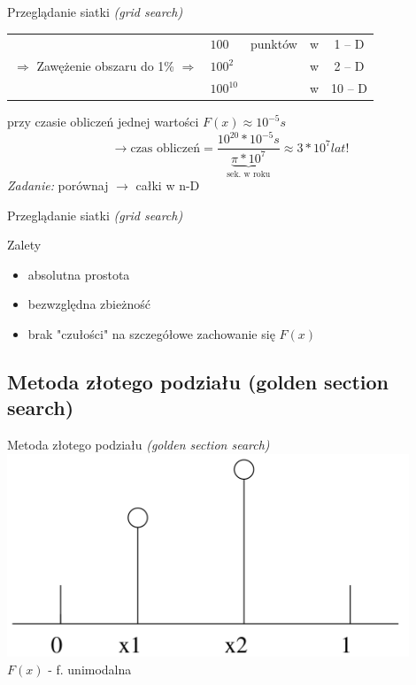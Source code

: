   \begin{frame}{Przeglądanie siatki \emph{(grid search)}}
    \begin{tabular}{@{} c l c c c @{}}
      & $ 100 $ & punktów & w & 1 -- D \\
      $ \Rightarrow $ Zawężenie obszaru do 1\% $ \Rightarrow $ & $ 100^{2} $ & & w & 2 -- D \\
      & $ 100^{10} $ & & w & 10 -- D \\
    \end{tabular}
    przy czasie obliczeń jednej wartości $F(x) \approx 10^{-5}s$
    \begin{displaymath}
      \to \text{czas obliczeń} = \frac{10^{20}*10^{-5}s}{\underbrace{\pi * 10^{7}}_{\text{sek. w roku}}} \approx 3 * 10^{7}lat \text{!}
    \end{displaymath}
    \hfill \emph{Zadanie:} porównaj $\to$ całki w n-D
  \end{frame}

  \begin{frame}{Przeglądanie siatki \emph{(grid search)}}
    \begin{block}{Zalety}
      \begin{itemize}
        \item absolutna prostota
        \item bezwzględna zbieżność
        \item brak "czułości" na szczegółowe zachowanie się $F(x)$
      \end{itemize}
    \end{block}
  \end{frame}

\subsection{Metoda złotego podziału (golden section search)}
  \begin{frame}{Metoda złotego podziału \emph{(golden section search)}}
    \includegraphics[width=0.9\textwidth]{img/17/f_unimodalna}
    \\
    $F(x)$ - f. unimodalna
  \end{frame}

